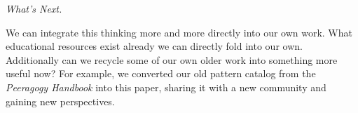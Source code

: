 
\begin{framed}
\noindent 
\emph{What's Next.}
\begin{collectinmacro}{\ReduceWN}{}{}
We can integrate this thinking more and more directly into our own work. What educational resources exist already we can directly fold into our own. Additionally can we recycle some of our own older work into something more useful now? For example, we converted our old pattern catalog from the \emph{Peeragogy Handbook} into this paper, sharing it with a new community and gaining new perspectives.
\end{collectinmacro}
\ReduceWN
\end{framed}



    
    
